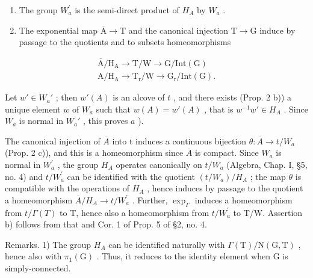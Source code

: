 \begin{enumerate}
\def\labelenumi{\alph{enumi})}
\item
  The group \(W_{a}^{\prime}\) is the semi-direct product of \(H_{A}\) by \(W_{a}\) .
\item
  The exponential map \(\overline{\mathrm{A}}\to \mathrm{T}\) and the canonical injection \(\mathrm{T}\rightarrow \mathrm{G}\) induce by passage to the quotients and to subsets homeomorphisms
\end{enumerate}

\[
\begin{array}{l} \overline {{\mathrm{A}}} / \mathrm {H_ {A}} \to \mathrm{T} / \mathrm{W} \to \mathrm{G} / \mathrm{Int} (\mathrm{G}) \\ \mathrm{A} / \mathrm {H_ {A}} \to \mathrm {T_ {r}} / \mathrm{W} \to \mathrm {G_ {r}} / \mathrm{Int} (\mathrm{G}). \end{array}
\]

Let \(w' \in W_a'\) ; then \(w'(A)\) is an alcove of \(t\) , and there exists (Prop. 2 b)) a unique element \(w\) of \(W_a\) such that \(w(A) = w'(A)\) , that is \(w^{-1}w' \in H_A\) . Since \(W_a\) is normal in \(W_a'\) , this proves \(a\) ).

The canonical injection of \(\overline{A}\) into t induces a continuous bijection \(\theta: \overline{A} \to t/W_{a}\) (Prop. 2 c)), and this is a homeomorphism since \(\overline{A}\) is compact. Since \(W_{a}\) is normal in \(W_{a}^{\prime}\) , the group \(H_{A}\) operates canonically on \(t/W_{a}\) (Algebra, Chap. I, §5, no. 4) and \(t/W_{a}^{\prime}\) can be identified with the quotient \((t/W_{a})/H_{A}\) ; the map \(\theta\) is compatible with the operations of \(H_{A}\) , hence induces by passage to the quotient a homeomorphism \(\overline{A}/H_{A} \to t/W_{a}^{\prime}\) . Further, \(\exp_{\Gamma}\) induces a homeomorphism from \(t/\Gamma(T)\) to T, hence also a homeomorphism from \(t/W_{a}^{\prime}\) to T/W. Assertion b) follows from that and Cor. 1 of Prop. 5 of §2, no. 4.

Remarks. 1) The group \(H_{A}\) can be identified naturally with \(\Gamma(\mathrm{T})/\mathrm{N}(\mathrm{G},\mathrm{T})\) , hence also with \(\pi_{1}(\mathrm{G})\) . Thus, it reduces to the identity element when G is simply-connected.

